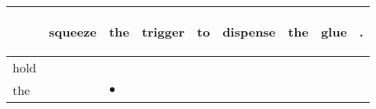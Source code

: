 \documentclass[landscape]{article}
\newcommand{\ssp}{\hspace{2pt}}
\newcommand{\mex}{\cellcolor{g}$\bullet$}
\begin{document}
\noindent\begin{tabular}{|l|p{10pt}|p{10pt}|p{10pt}|p{10pt}|p{10pt}|p{10pt}|p{10pt}|p{10pt}|}
\hline
&\begin{sideways}\cellcolor{ref0}squeeze\hspace{12pt}\end{sideways}&\begin{sideways}\cellcolor{ref1}the\hspace{12pt}\end{sideways}&\begin{sideways}\cellcolor{ref2}trigger\hspace{12pt}\end{sideways}&\begin{sideways}\cellcolor{ref3}to\hspace{12pt}\end{sideways}&\begin{sideways}\cellcolor{ref4}dispense\hspace{12pt}\end{sideways}&\begin{sideways}\cellcolor{ref5}the\hspace{12pt}\end{sideways}&\begin{sideways}\cellcolor{ref6}glue\hspace{12pt}\end{sideways}&\begin{sideways}\cellcolor{ref7}.\hspace{12pt}\end{sideways}\\
\hline
\ssp hold \ssp&\hspace{2pt}&\hspace{2pt}&\hspace{2pt}&\hspace{2pt}&\hspace{2pt}&\hspace{2pt}&\hspace{2pt}&\hspace{2pt}\\
\hline
\ssp \cellcolor{ref1}the \ssp&\hspace{2pt}&\hspace{2pt}\mex&\hspace{2pt}&\hspace{2pt}&\hspace{2pt}&\hspace{2pt}&\hspace{2pt}&\hspace{2pt}\\

\end{tabular}
\end{document}
